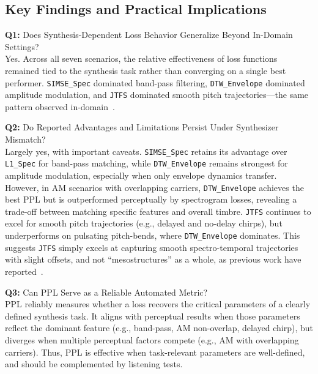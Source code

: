 \documentclass[10pt]{article} %
\newcommand{\SIMSESpec}{\texttt{SIMSE\_\allowbreak Spec}\xspace}
\newcommand{\LoneSpec}{\texttt{L1\_\allowbreak Spec}\xspace}
\newcommand{\JTFS}{\texttt{JTFS}\xspace}
\newcommand{\DTWEnv}{\texttt{DTW\_\allowbreak Envelope}\xspace}
\begin{document}
\subsection{Key Findings and Practical Implications}
\textbf{Q1:} Does Synthesis-Dependent Loss Behavior Generalize Beyond In-Domain Settings? \\ Yes. Across all seven scenarios, the relative effectiveness of loss functions remained tied to the synthesis task rather than converging on a single best performer. \SIMSESpec{} dominated band-pass filtering, \DTWEnv{} dominated amplitude modulation, and \JTFS{} dominated smooth pitch trajectories---the same pattern observed in-domain~\cite{salimi2025evaluating}.

\textbf{Q2:} Do Reported Advantages and Limitations Persist Under Synthesizer Mismatch?\\
Largely yes, with important caveats. \SIMSESpec{} retains its advantage over \LoneSpec{} for band-pass matching, while \DTWEnv{} remains strongest for amplitude modulation, especially when only envelope dynamics transfer. However, in AM scenarios with overlapping carriers, \DTWEnv{} achieves the best PPL but is outperformed perceptually by spectrogram losses, revealing a trade-off between matching specific features and overall timbre. \JTFS{} continues to excel for smooth pitch trajectories (e.g., delayed and no-delay chirps), but underperforms on pulsating pitch-bends, where \DTWEnv{} dominates. This suggests \JTFS simply excels at capturing smooth spectro-temporal trajectories with slight offsets, and not ``mesostructures'' as a whole, as previous work have reported~\cite{vahidi2023mesostructures,lostanlen2019shape}. 

\textbf{Q3:} Can PPL Serve as a Reliable Automated Metric?\\
PPL reliably measures whether a loss recovers the critical parameters of a clearly defined synthesis task. It aligns with perceptual results when those parameters reflect the dominant feature (e.g., band-pass, AM non-overlap, delayed chirp), but diverges when multiple perceptual factors compete (e.g., AM with overlapping carriers). Thus, PPL is effective when task-relevant parameters are well-defined, and should be complemented by listening tests.
\end{document}
